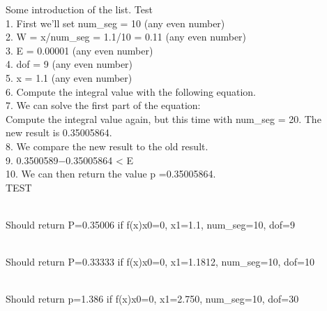\documentclass{purdue-slide}
\begin{document}
\begin{frame}{}
    \tiny Some introduction of the list.
    Test
\\1. First we’ll set num_seg = 10 (any even number)
\\2. W = x/num_seg = 1.1/10 = 0.11  (any even number)
\\3. E = 0.00001  (any even number)
\\4. dof = 9  (any even number)
\\5. x = 1.1  (any even number)
\\6. Compute the integral value with the following equation.
\\7. We can solve the first part of the equation:
\\Compute the integral value again, but this time with num_seg = 20. The
\\new result is 0.35005864.
\\8. We compare the new result to the old result.
\\9. 0.3500589−0.35005864 < E
\\10. We can then return the value p =0.35005864.
\\TEST

\\Should return P=0.35006 if f(x)x0=0, x1=1.1, num_seg=10, dof=9
 
\\Should return P=0.33333 if f(x)x0=0, x1=1.1812, num_seg=10, dof=10
 
\\Should return p=1.386 if f(x)x0=0, x1=2.750, num_seg=10, dof=30
    
\end{frame}
\end{document}
